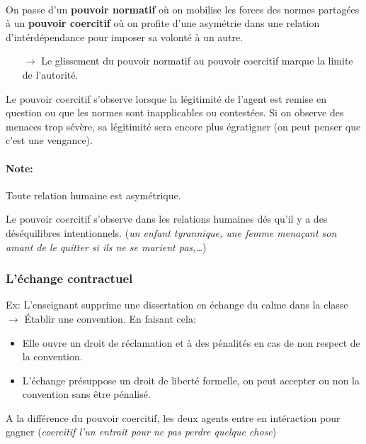 \documentclass[11pt]{article} %
\begin{document}
\paragraph{ }
On passe d'un \textbf{pouvoir normatif} où on mobilise les forces
des normes partagées à un \textbf{pouvoir coercitif} où on profite
d'une asymétrie dans une relation d'intérdépendance pour imposer sa
volonté à un autre.

\begin{itemize}
    \item[$\to$] Le glissement du pouvoir normatif au pouvoir coercitif
marque la limite de l'autorité.
\end{itemize}

Le pouvoir coercitif s'observe lorsque la légitimité de l'agent est
remise en question ou que les normes sont inapplicables ou contestées.
Si on observe des menaces trop sévère, sa légitimité sera encore
plus égratigner (on peut penser que c'est une vengance).

\paragraph{Note: }
Toute relation humaine est asymétrique.

Le pouvoir coercitif s'observe dans les relations humaines dés qu'il
y a des déséquilibres intentionnels. (\textit{un enfant tyrannique,
une femme menaçant son amant de le quitter si ils ne se marient
pas,\ldots})


\subsubsection{L'échange contractuel} 

Ex: L'enseignant supprime une dissertation en échange du calme 
dans la classe $\to$ Établir une convention. En faisant cela:

\begin{itemize}
 \item Elle ouvre un droit de réclamation et à des pénalités en cas
de non respect de la convention.

 \item L'échange présuppose un droit de liberté formelle, on peut
 accepter ou non la convention sans être pénalisé.
\end{itemize}

A la différence du pouvoir coercitif, les deux agents entre en
intéraction pour gagner (\textit{coercitif l'un entrait pour ne pas
perdre quelque chose})
\end{document}
